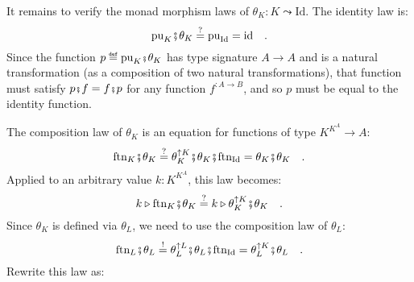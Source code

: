 It remains to verify the monad morphism laws of $\theta_{K}:K\leadsto\text{Id}$.
The identity law is:
\[
\text{pu}_{K}\bef\theta_{K}\overset{?}{=}\text{pu}_{\text{Id}}=\text{id}\quad.
\]
 Since the function $p\triangleq\text{pu}_{K}\bef\theta_{K}$ has
type signature $A\rightarrow A$ and is a natural transformation (as
a composition of two natural transformations), that function must
satisfy $p\bef f=f\bef p$ for any function $f^{:A\rightarrow B}$,
and so $p$ must be equal to the identity function.

The composition law of $\theta_{K}$ is an equation for functions
of type $K^{K^{A}}\rightarrow A$:
\[
\text{ftn}_{K}\bef\theta_{K}\overset{?}{=}\theta_{K}^{\uparrow K}\bef\theta_{K}\bef\text{ftn}_{\text{Id}}=\theta_{K}\bef\theta_{K}\quad.
\]
Applied to an arbitrary value $k:K^{K^{A}}$, this law becomes:
\[
k\triangleright\text{ftn}_{K}\bef\theta_{K}\overset{?}{=}k\triangleright\theta_{K}^{\uparrow K}\bef\theta_{K}\quad.
\]
Since $\theta_{K}$ is defined via $\theta_{L}$, we need to use the
composition law of $\theta_{L}$:
\[
\text{ftn}_{L}\bef\theta_{L}\overset{!}{=}\theta_{L}^{\uparrow L}\bef\theta_{L}\bef\text{ftn}_{\text{Id}}=\theta_{L}^{\uparrow K}\bef\theta_{L}\quad.
\]
Rewrite this law as:
